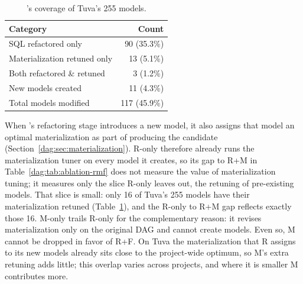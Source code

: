 
\begin{table}[tb]
\centering
\caption{\dagsmith{}'s coverage of Tuva's 255 models. }
\inv
\label{dag:tab:coverage}
\small
\begin{tabular}{lr}
\toprule
Category & Count \\
\midrule
SQL refactored only              & 90 (35.3\%) \\
Materialization retuned only     & 13 \phantom{(0}(5.1\%) \\
Both refactored \& retuned       &  3 \phantom{(0}(1.2\%) \\
New models created               & 11 \phantom{(0}(4.3\%) \\
\midrule
Total models modified            & 117 (45.9\%) \\
\bottomrule
\end{tabular}
\inv
\end{table}




 When \dagsmith{}'s refactoring stage introduces a new model, it also assigns that model an optimal materialization as part of producing the candidate (Section~\ref{dag:sec:materialization}). R-only therefore already runs the materialization tuner on every model it creates, so its gap to R+M in Table~\ref{dag:tab:ablation-rmf} does not measure the value of materialization tuning; it measures only the slice R-only leaves out, the retuning of pre-existing models. 
That slice is small: only 16 of Tuva's 255 models have their materialization retuned (Table~\ref{dag:tab:coverage}), and the R-only to R+M gap reflects exactly those 16. M-only trails R-only for the complementary reason: it revises materialization only on the original DAG and cannot create models. Even so, M cannot be dropped in favor of R+F. On Tuva the materialization that R assigns to its new models already sits close to the project-wide optimum, so M's extra retuning adds little; this overlap varies across projects, and where it is smaller M contributes more.





